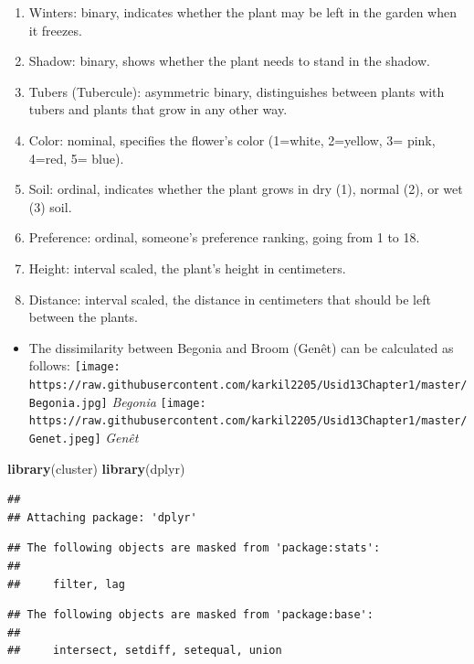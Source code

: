 \documentclass[
]{article}
\newenvironment{Shaded}{\begin{snugshade}}{\end{snugshade}}
\newcommand{\KeywordTok}[1]{\textcolor[rgb]{0.13,0.29,0.53}{\textbf{#1}}}
\newcommand{\NormalTok}[1]{#1}
\providecommand{\tightlist}{%
  \setlength{\itemsep}{0pt}\setlength{\parskip}{0pt}}
\begin{document}
\begin{enumerate}
\def\labelenumi{\arabic{enumi}.}
\tightlist
\item
  Winters: binary, indicates whether the plant may be left in the garden
  when it freezes.
\item
  Shadow: binary, shows whether the plant needs to stand in the shadow.
\item
  Tubers (Tubercule): asymmetric binary, distinguishes between plants
  with tubers and plants that grow in any other way.
\item
  Color: nominal, specifies the flower's color (1=white, 2=yellow, 3=
  pink, 4=red, 5= blue).
\item
  Soil: ordinal, indicates whether the plant grows in dry (1), normal
  (2), or wet (3) soil.
\item
  Preference: ordinal, someone's preference ranking, going from 1 to 18.
\item
  Height: interval scaled, the plant's height in centimeters.
\item
  Distance: interval scaled, the distance in centimeters that should be
  left between the plants.
\end{enumerate}

\begin{itemize}
\tightlist
\item
  The dissimilarity between Begonia and Broom (Genêt) can be calculated
  as follows:
  \texttt{[image: https://raw.githubusercontent.com/karkil2205/Usid13Chapter1/master/Begonia.jpg]}
  \emph{Begonia}
  \texttt{[image: https://raw.githubusercontent.com/karkil2205/Usid13Chapter1/master/Genet.jpeg]}
  \emph{Genêt}
\end{itemize}

\begin{Shaded}
\begin{Highlighting}[]
\KeywordTok{library}\NormalTok{(cluster)}
\KeywordTok{library}\NormalTok{(dplyr)}
\end{Highlighting}
\end{Shaded}

\begin{verbatim}
## 
## Attaching package: 'dplyr'
\end{verbatim}

\begin{verbatim}
## The following objects are masked from 'package:stats':
## 
##     filter, lag
\end{verbatim}

\begin{verbatim}
## The following objects are masked from 'package:base':
## 
##     intersect, setdiff, setequal, union
\end{verbatim}
\end{document}

